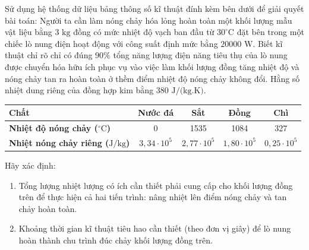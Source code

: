 \begin{ex}	Sử dụng hệ thống dữ liệu bảng thông số kĩ thuật đính kèm bên dưới để giải quyết bài toán: Người ta cần làm nóng chảy hóa lỏng hoàn toàn một khối lượng mẫu vật liệu bằng $3\text{ kg}$ đồng có mức nhiệt độ vạch ban đầu từ $30^\circ\text{C}$ đặt bên trong một chiếc lò nung điện hoạt động với công suất định mức bằng $20000\text{ W}$. Biết kĩ thuật chỉ rõ chỉ có đúng $90\%$ tổng năng lượng điện năng tiêu thụ của lò nung được chuyển hóa hữu ích phục vụ vào việc làm khối lượng đồng tăng nhiệt độ và nóng chảy tan ra hoàn toàn ở thềm điểm nhiệt độ nóng chảy không đổi. Hằng số nhiệt dung riêng của đồng hợp kim bằng $380\text{ J/(kg.K)}$.
	\begin{center}
		\begin{tabular}{|l|c|c|c|c|}
			\hline
			\textbf{Chất} & \textbf{Nước đá} & \textbf{Sắt} & \textbf{Đồng} & \textbf{Chì} \\ \hline
			\textbf{Nhiệt độ nóng chảy ($^\circ\text{C}$)} & 0 & 1535 & 1084 & 327 \\ \hline
			\textbf{Nhiệt nóng chảy riêng ($\text{J/kg}$)} & $3,34 \cdot 10^5$ & $2,77 \cdot 10^5$ & $1,80 \cdot 10^5$ & $0,25 \cdot 10^5$ \\ \hline
		\end{tabular}
	\end{center}
	Hãy xác định:
	\begin{enumerate}
		\item[a)] Tổng lượng nhiệt lượng có ích cần thiết phải cung cấp cho khối lượng đồng trên để thực hiện cả hai tiến trình: nâng nhiệt lên điểm nóng chảy và tan chảy hoàn toàn.
		\item[b)] Khoảng thời gian kĩ thuật tiêu hao cần thiết (theo đơn vị giây) để lò nung hoàn thành chu trình đúc chảy khối lượng đồng trên.
	\end{enumerate}
\end{ex}
